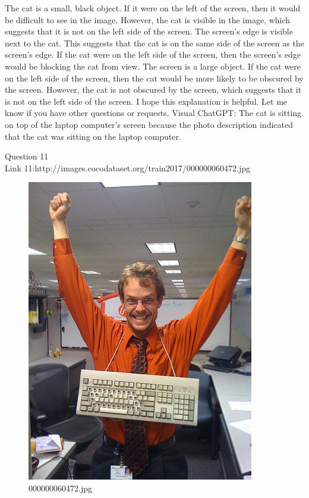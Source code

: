 \begin{enumerate}
        The cat is a small, black object. If it were on the left of the screen, then it would be difficult to see in the image. However, the cat is visible in the image, which suggests that it is not on the left side of the screen.
        The screen's edge is visible next to the cat. This suggests that the cat is on the same side of the screen as the screen's edge. If the cat were on the left side of the screen, then the screen's edge would be blocking the cat from view.
        The screen is a large object. If the cat were on the left side of the screen, then the cat would be more likely to be obscured by the screen. However, the cat is not obscured by the screen, which suggests that it is not on the left side of the screen.
        I hope this explanation is helpful. Let me know if you have other questions or requests.
        \subitem Visual ChatGPT: The cat is sitting on top of the laptop computer’s screen because the photo description indicated that the cat was sitting on the laptop computer.
    \end{enumerate}
Question 11\\
Link 11:http://images.cocodataset.org/train2017/000000060472.jpg
    \begin{figure}[h]
        \centering
        \includegraphics[width=0.8\linewidth]{../image set/easy/000000060472.jpg}
        \caption{000000060472.jpg}
    \end{figure}
